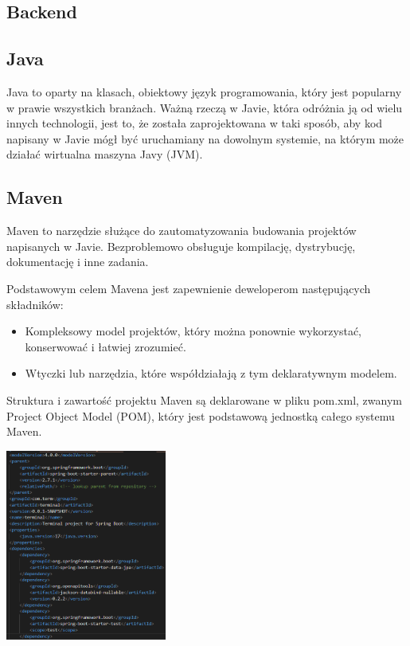 \documentclass[10pt,a4paper]{report}
\begin{document}
\begin{adjustwidth}{2cm}{2cm}
\section{Backend}
\subsection{Java}
\begin{minipage}{1\linewidth}
Java to oparty na klasach, obiektowy  język programowania, który  jest popularny w prawie wszystkich branżach. 
Ważną rzeczą w Javie, która odróżnia ją od wielu innych technologii, jest to, że została zaprojektowana w taki sposób, aby kod napisany w Javie mógł być uruchamiany na dowolnym systemie, na którym może działać wirtualna maszyna Javy (JVM). 
\end{minipage}
\subsection{Maven}
\begin{minipage}{1\linewidth}
Maven to narzędzie służące do zautomatyzowania budowania projektów napisanych w Javie.
Bezproblemowo obsługuje kompilację, dystrybucję, dokumentację i inne zadania.
\end{minipage}
\begin{minipage}{1\linewidth}
Podstawowym celem Mavena jest zapewnienie deweloperom następujących składników:
\begin{itemize}
    \item Kompleksowy model projektów, który można ponownie wykorzystać, konserwować i łatwiej zrozumieć.
    \item Wtyczki lub narzędzia, które współdziałają z tym deklaratywnym modelem.
\end{itemize} 
Struktura i zawartość projektu Maven są deklarowane w pliku pom.xml, zwanym Project Object Model (POM), który jest podstawową jednostką całego systemu Maven.
\vspace{0.2cm}
\end{minipage}
\begin{center}
\includegraphics[width=200px]{img/pom}

\end{center}
\end{adjustwidth}
\end{document}
